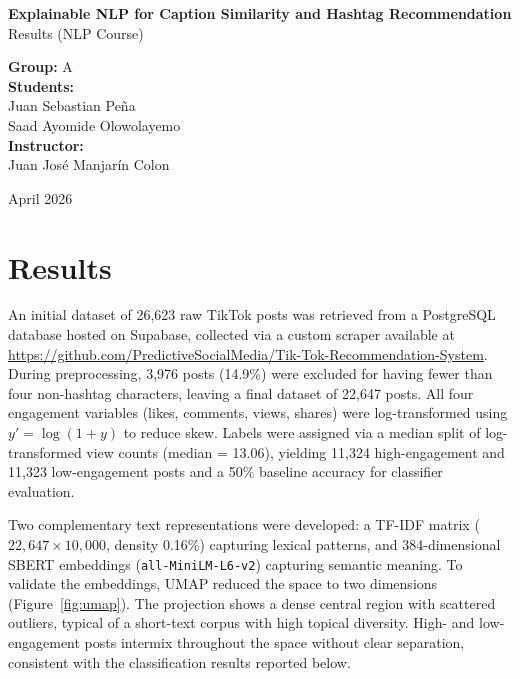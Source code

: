 \documentclass[12pt]{article}
\begin{document}
\begin{titlepage}
    \centering
    \vspace*{3cm}

    {\LARGE \textbf{Explainable NLP for Caption Similarity and
    Hashtag Recommendation}}\\[1.2em]
    {\large Results (NLP Course)}

    \vspace{3cm}

    \textbf{Group:} A\\[0.8em]

    \textbf{Students:}\\
    Juan Sebastian Pe\~na\\
    Saad Ayomide Olowolayemo\\[0.8em]

    \textbf{Instructor:}\\
    Juan Jos\'e Manjar\'in Colon

    \vfill

    {\large April 2026}
\end{titlepage}

\section*{Results}

\setlength{\parindent}{1.5em}

An initial dataset of 26,623 raw TikTok posts was retrieved from a
PostgreSQL database hosted on Supabase, collected via a custom scraper
available at \url{https://github.com/PredictiveSocialMedia/Tik-Tok-Recommendation-System}.
During preprocessing, 3,976 posts (14.9\%) were excluded for having fewer
than four non-hashtag characters, leaving a final dataset of 22,647 posts.
All four engagement variables (likes, comments, views, shares) were
log-transformed using $y' = \log(1 + y)$ to reduce skew. Labels were
assigned via a median split of log-transformed view counts (median = 13.06),
yielding 11,324 high-engagement and 11,323 low-engagement posts and a 50\%
baseline accuracy for classifier evaluation.

Two complementary text representations were developed: a TF-IDF matrix
($22{,}647 \times 10{,}000$, density 0.16\%) capturing lexical patterns,
and 384-dimensional SBERT embeddings (\texttt{all-MiniLM-L6-v2}) capturing
semantic meaning. To validate the embeddings, UMAP reduced the space to two
dimensions (Figure~\ref{fig:umap}). The projection shows a dense central
region with scattered outliers, typical of a short-text corpus with high
topical diversity. High- and low-engagement posts intermix throughout the
space without clear separation, consistent with the classification results
reported below.
\end{document}
